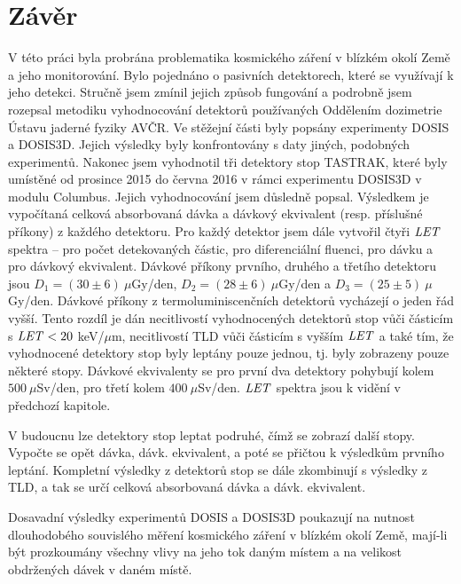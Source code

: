 \chapter*{Závěr}
\markright{}
V této práci byla probrána problematika kosmického záření v blízkém okolí Země a jeho monitorování. Bylo pojednáno o pasivních detektorech, které se využívají k jeho detekci. Stručně jsem zmínil jejich způsob fungování a podrobně jsem rozepsal metodiku vyhodnocování detektorů používaných Oddělením dozimetrie Ústavu jaderné fyziky AVČR. Ve stěžejní části byly popsány experimenty DOSIS a DOSIS3D. Jejich výsledky byly konfrontovány s daty jiných, podobných experimentů. Nakonec jsem vyhodnotil tři detektory stop TASTRAK, které byly umístěné od prosince 2015 do června 2016 v rámci experimentu DOSIS3D v modulu Columbus. Jejich vyhodnocování jsem důsledně popsal. Výsledkem je vypočítaná celková absorbovaná dávka a dávkový ekvivalent (resp. příslušné příkony) z každého detektoru. Pro každý detektor
jsem dále vytvořil čtyři $\mathit{LET}$ spektra -- pro počet detekovaných částic, pro diferenciální fluenci, pro dávku a pro dávkový ekvivalent. Dávkové příkony prvního, druhého a třetího detektoru jsou $D_1=(30\pm6)\ \mu$Gy/den, $D_2=(28\pm6)\ \mu$Gy/den a $D_3=(25\pm5)\ \mu$Gy/den. Dávkové příkony z termoluminiscenčních detektorů vycházejí o jeden řád vyšší. Tento rozdíl je dán necitlivostí vyhodnocených detektorů stop vůči částicím s $\mathit{LET}<20$ keV/$\mu$m, necitlivostí TLD vůči částicím s vyšším $\mathit{LET}$ a také tím, že vyhodnocené detektory stop byly leptány pouze jednou, tj. byly zobrazeny pouze některé stopy. Dávkové ekvivalenty se pro první dva detektory pohybují kolem $500\ \mu$Sv/den, pro třetí kolem $400\ \mu$Sv/den. $\mathit{LET}$ spektra jsou k vidění v předchozí kapitole.

V budoucnu lze detektory stop leptat podruhé, čímž se zobrazí další stopy. Vypočte se opět dávka, dávk. ekvivalent, a poté se přičtou k výsledkům prvního leptání. Kompletní výsledky z detektorů stop se dále zkombinují s výsledky z TLD, a tak se určí celková absorbovaná dávka a dávk. ekvivalent. 

Dosavadní výsledky experimentů DOSIS a DOSIS3D poukazují na nutnost dlouhodobého souvislého měření kosmického záření v blízkém okolí Země, mají-li být prozkoumány všechny vlivy na jeho tok daným místem a na velikost obdržených dávek v daném místě.
